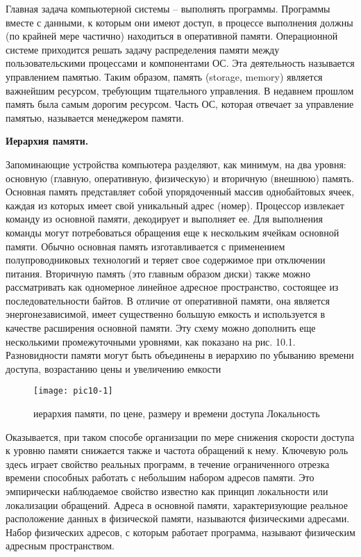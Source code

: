 Главная задача компьютерной системы – выполнять программы. Программы вместе с данными, к которым они имеют доступ, в процессе выполнения должны (по крайней мере частично) находиться в оперативной памяти. Операционной системе приходится решать задачу распределения памяти между пользовательскими процессами и компонентами ОС. Эта деятельность называется управлением памятью. Таким образом, память (storage, memory) является важнейшим ресурсом, требующим тщательного управления. В недавнем прошлом память была самым дорогим ресурсом.
Часть ОС, которая отвечает за управление памятью, называется менеджером памяти.

\begin{center}{\bfseries Иерархия памяти.}
\end{center}

Запоминающие устройства компьютера разделяют, как минимум, на два уровня: основную (главную, оперативную, физическую) и вторичную (внешнюю) память.
Основная память представляет собой упорядоченный массив однобайтовых ячеек, каждая из которых имеет свой уникальный адрес (номер). Процессор извлекает команду из основной памяти, декодирует и выполняет ее. Для выполнения команды могут потребоваться обращения еще к нескольким ячейкам основной памяти. Обычно основная память изготавливается с применением полупроводниковых технологий и теряет свое
содержимое при отключении питания.
Вторичную память (это главным образом диски) также можно рассматривать как одномерное линейное адресное пространство, состоящее из последовательности байтов. В отличие от оперативной памяти, она является энергонезависимой, имеет существенно большую емкость и используется в качестве расширения основной памяти. Эту схему можно дополнить еще несколькими промежуточными уровнями, как показано на рис. 10.1. Разновидности памяти могут быть объединены в иерархию по убыванию времени доступа, возрастанию цены и увеличению емкости

\begin{figure}[h]
  \begin{center}
  \texttt{[image: pic10-1]}
  \caption{иерархия памяти, по цене, размеру и времени доступа Локальность}
  \end{center}
\end{figure}


Оказывается, при таком способе организации по мере снижения скорости доступа к уровню памяти снижается также и частота обращений к нему.
Ключевую роль здесь играет свойство реальных программ, в течение ограниченного отрезка времени способных работать с небольшим набором адресов памяти. Это эмпирически наблюдаемое свойство известно как принцип локальности или локализации обращений.
Адреса в основной памяти, характеризующие реальное расположение данных в физической памяти, называются физическими адресами. Набор физических адресов, с которым работает программа, называют физическим адресным пространством.

